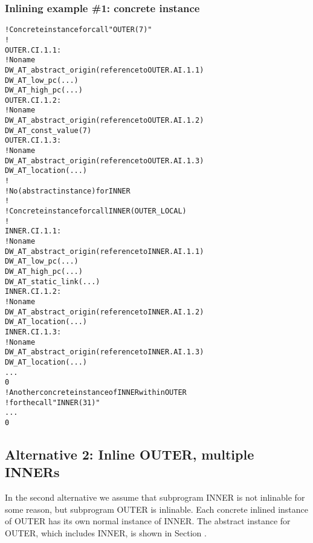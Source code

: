 \subsubsection{Inlining example \#1: concrete instance}
\label{app:inliningexample1concreteinstance}
\begin{alltt}
! Concrete instance for call "OUTER(7)"
!
OUTER.CI.1.1:
        ! No name
        DW\_AT\_abstract\_origin(reference to OUTER.AI.1.1)
        DW\_AT\_low\_pc(...)
        DW\_AT\_high\_pc(...)
OUTER.CI.1.2:
            ! No name
            DW\_AT\_abstract\_origin(reference to OUTER.AI.1.2)
            DW\_AT\_const\_value(7)
OUTER.CI.1.3:
            ! No name
            DW\_AT\_abstract\_origin(reference to OUTER.AI.1.3)
            DW\_AT\_location(...)
        !
        ! No  (abstract instance) for INNER
        !
        ! Concrete instance for call INNER(OUTER\_LOCAL)
        !
INNER.CI.1.1:
            ! No name
            DW\_AT\_abstract\_origin(reference to INNER.AI.1.1)
            DW\_AT\_low\_pc(...)
            DW\_AT\_high\_pc(...)
            DW\_AT\_static\_link(...)
INNER.CI.1.2:
                ! No name
                DW\_AT\_abstract\_origin(reference to INNER.AI.1.2)
                DW\_AT\_location(...)
INNER.CI.1.3:
                ! No name
                DW\_AT\_abstract\_origin(reference to INNER.AI.1.3)
                DW\_AT\_location(...)
            ...
            0
        ! Another concrete instance of INNER within OUTER
        ! for the call "INNER(31)"
        ...
        0
\end{alltt}

\subsection{Alternative 2: Inline OUTER, multiple INNERs}
\label{app:inlineoutermultiipleinners}


In the second alternative we assume that subprogram INNER
is not inlinable for some reason, but subprogram OUTER is
inlinable. Each concrete inlined instance of OUTER has its
own normal instance of INNER. The abstract instance for OUTER,
which includes INNER, is shown in 
Section .


